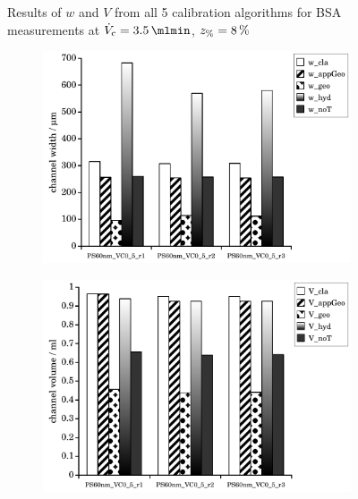 \begin{figure}[htp]
\begin{center}
\begin{subfigure}{\subFigSize}
    \end{subfigure}
  \end{center}
  \vspace*{-4ex}    
  \caption[Results of $w$ and $V$ from all 5 calibration algorithms for BSA measurements at
  $\Vc = \SI{3.5}{\mlmin}$, $\zP = \SI{8}{\percent}$]{
    Results of $w$ and $V$ from all 5 calibration algorithms for BSA measurements at
    $\Vc = \SI{3.5}{\mlmin}$, $\zP = \SI{8}{\percent}$
  }
  \label{fig:calibRes_BSA_VC3_5}
\end{figure}
\begin{figure}[!hb]
  \begin{center}
    \begin{subfigure}{\subFigSize}
      \includegraphics[width=\linewidth]{./images/data/eval_own_p8/calibW_PS_VC_0_5_p8.pdf}
    \end{subfigure}
    \begin{subfigure}{\subFigSize}
      \includegraphics[width=\linewidth]{./images/data/eval_own_p8/calibV_PS_VC_0_5_p8.pdf}

\end{subfigure}
\end{center}
\end{figure}
